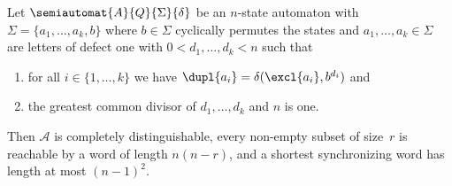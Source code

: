 \begin{theorem} \label{syncmax:classes:thm:circular} \label{sync_max:prop:don}
	Let $\semiautomat{A}{Q}{\Sigma}{\delta}$ be an $n$-state automaton with $\Sigma = \{a_1, \ldots, a_k, b\}$
	where $b \in \Sigma$ cyclically permutes the states and
	$a_1, \ldots, a_k \in \Sigma$ are letters of defect one
	with $0 < d_1, \ldots, d_k < n$	such that
	\begin{enumerate}
	\item for all $i \in \{1,\ldots,k\}$ we have $\dupl{a_i} = \delta(\excl{a_i}, b^{d_i})$ and
	
	\item the greatest common divisor of $d_1, \ldots, d_k$ and $n$ is one.
	\end{enumerate}
	Then $\mathcal A$ is completely distinguishable,
	every non-empty subset of size~$r$ is reachable by a word of length $n(n - r)$,
	and a shortest synchronizing word has length at most $(n - 1)^2$.
\end{theorem}
